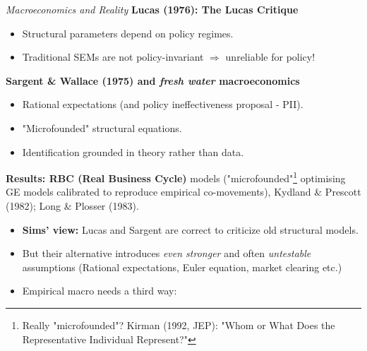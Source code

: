 \documentclass{beamer}
\begin{document}
\begin{frame}{\textit{Macroeconomics and Reality }}
\footnotesize
\textbf{Lucas (1976): The Lucas Critique}
\begin{itemize}
    \item Structural parameters depend on policy regimes.
    \item Traditional SEMs are not policy-invariant $\Rightarrow$ unreliable for policy!
\end{itemize}

\textbf{Sargent \& Wallace (1975) and \textit{fresh water} macroeconomics}
\begin{itemize}
    \item Rational expectations (and policy ineffectiveness proposal - PII).
    \item "Microfounded" structural equations.
    \item Identification grounded in theory rather than data.
\end{itemize}
\textbf{Results: RBC (Real Business Cycle)} models ("microfounded"\footnote{\scriptsize Really "microfounded"? Kirman (1992, JEP): "Whom or What Does the Representative Individual Represent?"} optimising GE models calibrated to reproduce empirical co-movements), Kydland \& Prescott (1982); Long \& Plosser (1983).
\medskip

\begin{itemize}
    \item \textbf{Sims’ view: }Lucas and Sargent are correct to criticize old structural models.
    \item But their alternative introduces \emph{even stronger} and often
          \emph{untestable} assumptions (Rational expectations, Euler equation, market clearing etc.)
    \item Empirical macro needs a third way: 
\end{itemize}

\end{frame}
\end{document}
